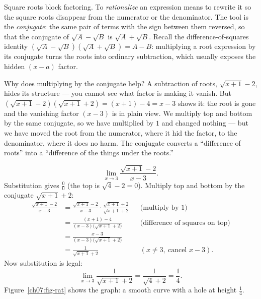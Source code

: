 Square roots block factoring. To \emph{rationalize} an expression means to
rewrite it so the square roots disappear from the numerator or the denominator.
The tool is the \emph{conjugate}: the
same pair of terms with the sign between them reversed, so that the conjugate
of $\sqrt{A}-\sqrt{B}$ is $\sqrt{A}+\sqrt{B}$. Recall the
difference-of-squares identity $(\sqrt{A}-\sqrt{B})(\sqrt{A}+\sqrt{B}) = A-B$:
multiplying a root expression by its conjugate turns the roots into ordinary
subtraction, which usually exposes the hidden $(x-a)$ factor.

\begin{whybox}
Why does multiplying by the conjugate help? A subtraction of roots,
$\sqrt{x+1}-2$, hides its structure --- you cannot see what factor is making it vanish.
But $(\sqrt{x+1}-2)(\sqrt{x+1}+2) = (x+1)-4 = x-3$ shows it: the root is
gone and the vanishing factor $(x-3)$ is in plain view. We multiply top and
bottom by the same conjugate, so we have multiplied by $1$ and changed
nothing --- but we have moved the root from the
numerator, where it hid the factor, to the denominator, where it does no harm. The conjugate converts a
``difference of roots'' into a ``difference of the things under the roots.''
\end{whybox}

\begin{example}
\label{ch07:ex-rat1}
\[
  \lim_{x\to 3}\frac{\sqrt{x+1}-2}{x-3}.
\]
Substitution gives $\frac{0}{0}$ (the top is $\sqrt4-2=0$). Multiply top and
bottom by the conjugate $\sqrt{x+1}+2$:
\begin{align*}
  \frac{\sqrt{x+1}-2}{x-3}
  &= \frac{\sqrt{x+1}-2}{x-3}\cdot\frac{\sqrt{x+1}+2}{\sqrt{x+1}+2}
    && \text{(multiply by $1$)}\\
  &= \frac{(x+1)-4}{(x-3)\big(\sqrt{x+1}+2\big)}
    && \text{(difference of squares on top)}\\
  &= \frac{x-3}{(x-3)\big(\sqrt{x+1}+2\big)}\\
  &= \frac{1}{\sqrt{x+1}+2}
    && (x\neq 3,\ \text{cancel } x-3).
\end{align*}
Now substitution is legal:
\[
  \lim_{x\to 3}\frac{1}{\sqrt{x+1}+2} = \frac{1}{\sqrt4+2} = \frac14.
\]
Figure~\ref{ch07:fig-rat} shows the graph: a smooth curve with a hole at
height $\frac14$.
\end{example}

